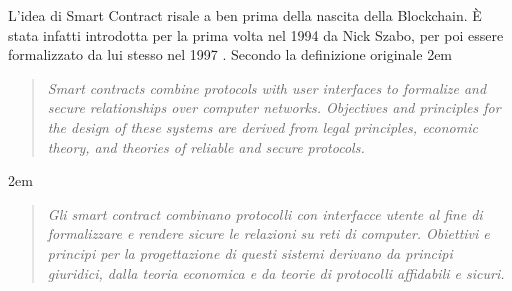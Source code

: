 L'idea di Smart Contract risale a ben prima della nascita della Blockchain. È stata infatti introdotta
per la prima volta nel 1994 da Nick Szabo, per poi
essere formalizzato da lui stesso nel 1997 \cite{szabo-smart-contracts}.
Secondo la definizione originale
\begingroup
\advance\leftmargini 2em
\begin{quote}
	{
		{\em Smart contracts combine protocols with user interfaces to formalize
				and secure relationships over computer networks.
				Objectives and principles for the design of these systems
				are derived from legal principles, economic theory,
				and theories of reliable and secure protocols.}
	}
\end{quote}
\endgroup
\begingroup
\advance\leftmargini 2em
\begin{quote}
	{
		{\em Gli smart contract combinano protocolli con interfacce utente
				al fine di formalizzare e rendere sicure
				le relazioni su reti di computer.
				Obiettivi e principi per la progettazione di questi sistemi
				derivano da principi giuridici, dalla teoria economica
				e da teorie di protocolli affidabili e sicuri.}
	}
\end{quote}
\endgroup

